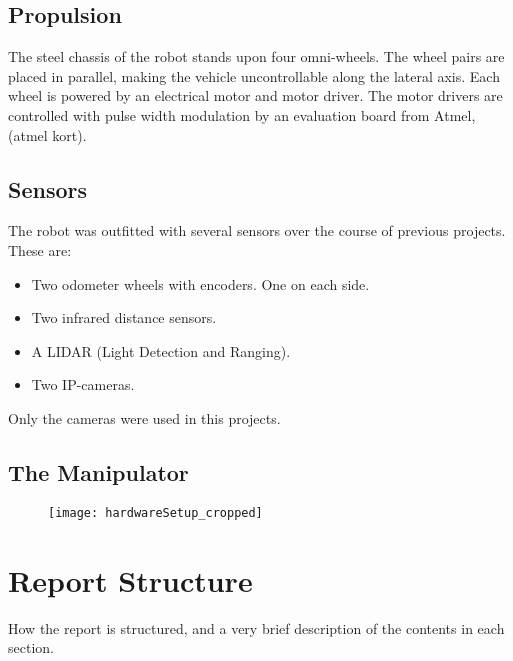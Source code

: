 \subsection{Propulsion}

The steel chassis of the robot stands upon four omni-wheels. The wheel pairs are placed in parallel, making the vehicle uncontrollable along the lateral axis. Each wheel is powered by an electrical motor and motor driver. The motor drivers are controlled with pulse width modulation by an evaluation board from Atmel,(atmel kort).  

\subsection{Sensors}

The robot was outfitted with several sensors over the course of previous projects. These are:
\begin{itemize}
	\item Two odometer wheels with encoders. One on each side. 
	\item Two infrared distance sensors. 
	\item A LIDAR (Light Detection and Ranging).
	\item Two IP-cameras.
\end{itemize} 

Only the cameras were used in this projects. 

\subsection{The Manipulator}

\begin{figure}
	\texttt{[image: hardwareSetup\_cropped]}
\end{figure}

\section{Report Structure}
How the report is structured, and a very brief description of the contents in each section.